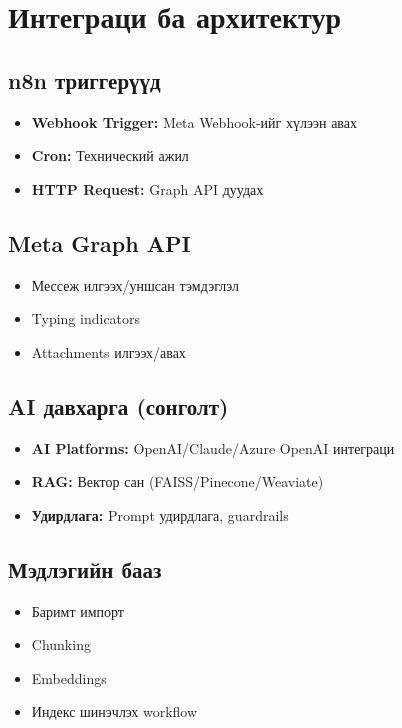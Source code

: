 \documentclass[12pt,A4]{report}
\begin{document}
\section{Интеграци ба архитектур}

\subsection{n8n триггерүүд}
\begin{itemize}
    \item \textbf{Webhook Trigger:} Meta Webhook-ийг хүлээн авах
    \item \textbf{Cron:} Технический ажил
    \item \textbf{HTTP Request:} Graph API дуудах
\end{itemize}

\subsection{Meta Graph API}
\begin{itemize}
    \item Мессеж илгээх/уншсан тэмдэглэл
    \item Typing indicators
    \item Attachments илгээх/авах
\end{itemize}

\subsection{AI давхарга (сонголт)}
\begin{itemize}
    \item \textbf{AI Platforms:} OpenAI/Claude/Azure OpenAI интеграци
    \item \textbf{RAG:} Вектор сан (FAISS/Pinecone/Weaviate)
    \item \textbf{Удирдлага:} Prompt удирдлага, guardrails
\end{itemize}

\subsection{Мэдлэгийн бааз}
\begin{itemize}
    \item Баримт импорт
    \item Chunking
    \item Embeddings
    \item Индекс шинэчлэх workflow
\end{itemize}
\end{document}
